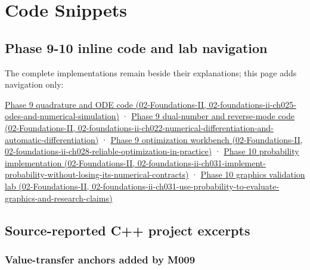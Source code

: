 \hypertarget{appendix-4e2236f53445}{}
\section{Code Snippets}\label{appendix-4e2236f53445-code-snippets}

\subsection{Phase 9-10 inline code and lab navigation}\label{appendix-4e2236f53445-phase-9-10-inline-code-and-lab-navigation}

The complete implementations remain beside their explanations; this page adds navigation only:

\href{../02-Foundations-II/main.pdf\#nameddest=02-foundations-ii-ch025-odes-and-numerical-simulation}{Phase 9 quadrature and ODE code (02-Foundations-II, 02-foundations-ii-ch025-odes-and-numerical-simulation)} · \href{../02-Foundations-II/main.pdf\#nameddest=02-foundations-ii-ch022-numerical-differentiation-and-automatic-differentiation}{Phase 9 dual-number and reverse-mode code (02-Foundations-II, 02-foundations-ii-ch022-numerical-differentiation-and-automatic-differentiation)} · \href{../02-Foundations-II/main.pdf\#nameddest=02-foundations-ii-ch028-reliable-optimization-in-practice}{Phase 9 optimization workbench (02-Foundations-II, 02-foundations-ii-ch028-reliable-optimization-in-practice)} · \href{../02-Foundations-II/main.pdf\#nameddest=02-foundations-ii-ch031-implement-probability-without-losing-its-numerical-contracts}{Phase 10 probability implementation (02-Foundations-II, 02-foundations-ii-ch031-implement-probability-without-losing-its-numerical-contracts)} · \href{../02-Foundations-II/main.pdf\#nameddest=02-foundations-ii-ch031-use-probability-to-evaluate-graphics-and-research-claims}{Phase 10 graphics validation lab (02-Foundations-II, 02-foundations-ii-ch031-use-probability-to-evaluate-graphics-and-research-claims)}

\subsection{Source-reported C++ project excerpts}\label{appendix-4e2236f53445-source-reported-c-project-excerpts}

\subsubsection{Value-transfer anchors added by M009}\label{appendix-4e2236f53445-value-transfer-anchors-added-by-m009}


